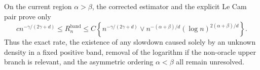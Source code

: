 On the current region \(\alpha>\beta\), the corrected estimator and the explicit Le Cam pair prove only
\[
c n^{-\gamma/(2\gamma+d)}\leq R_n^{\mathrm{band}}
\leq C\left\{n^{-\gamma/(2\gamma+d)}\vee
n^{-(\alpha+\beta)/d}(\log n)^{2(\alpha+\beta)/d}\right\}.
\]
Thus the exact rate, the existence of any slowdown caused solely by an unknown density in a fixed positive band, removal of the logarithm if the non-oracle upper branch is relevant, and the asymmetric ordering \(\alpha<\beta\) all remain unresolved.